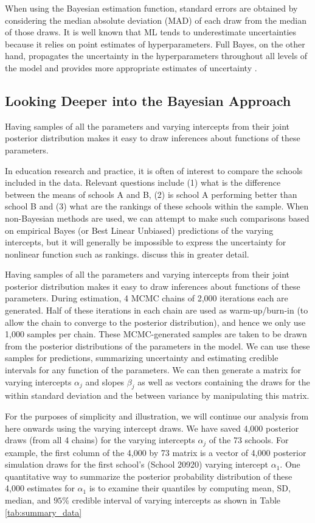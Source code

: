 When using the Bayesian estimation function, standard errors are obtained by considering the median absolute deviation (MAD) of each draw from the median of those draws.  It is well known that ML tends to underestimate uncertainties because it relies on point estimates of hyperparameters. Full Bayes, on the other hand, propagates the uncertainty in the hyperparameters throughout all levels of the model and provides more appropriate estimates of uncertainty \cite{browne2006comparison}.

\subsection{Looking Deeper into the Bayesian Approach}
\label{section:Deeper}
Having samples of all the parameters and varying intercepts from their joint posterior distribution makes it easy to draw inferences about functions of these parameters.

In education research and practice, it is often of interest to compare the schools included in the data. Relevant questions include (1) what is the difference between the means of schools A and B, (2) is school A performing better than school B and (3) what are the rankings of these schools within the sample. When non-Bayesian methods are used, we can attempt to make such comparisons based on empirical Bayes (or Best Linear Unbiased) predictions of the varying intercepts, but it will generally be impossible to express the uncertainty for nonlinear function such as rankings. \cite{goldstein1996league} discuss this in greater detail.

Having samples of all the parameters and varying intercepts from their joint posterior distribution makes it easy to draw inferences about functions of these parameters.
During estimation, 4 MCMC chains of 2,000 iterations each are generated. Half of these iterations in each chain are used as warm-up/burn-in (to allow the chain to converge to the posterior distribution), and hence we only use 1,000 samples per chain. These MCMC-generated samples are taken to be drawn from the posterior distributions of the parameters in the model. We can use these samples for predictions, summarizing uncertainty and estimating credible intervals for any function of the parameters.
We can then generate a matrix for varying intercepts $\alpha_j$ and slopes $\beta_j$ as well as vectors containing the draws for the within standard deviation and the between variance by manipulating this matrix.

For the purposes of simplicity and illustration, we will continue our analysis from here onwards using the varying intercept draws. We have saved 4,000 posterior draws (from all 4 chains) for the varying intercepts $\alpha_{j}$ of the 73 schools. For example, the first column of the 4,000 by 73 matrix is a vector of 4,000 posterior simulation draws for the first school's (School 20920) varying intercept $\alpha_{1}$.  One quantitative way to summarize the posterior probability distribution of these 4,000 estimates for $\alpha_{1}$ is to examine their quantiles by computing mean, SD, median, and $95\%$ credible interval of varying intercepts as shown in Table \ref{tab:summary_data}

